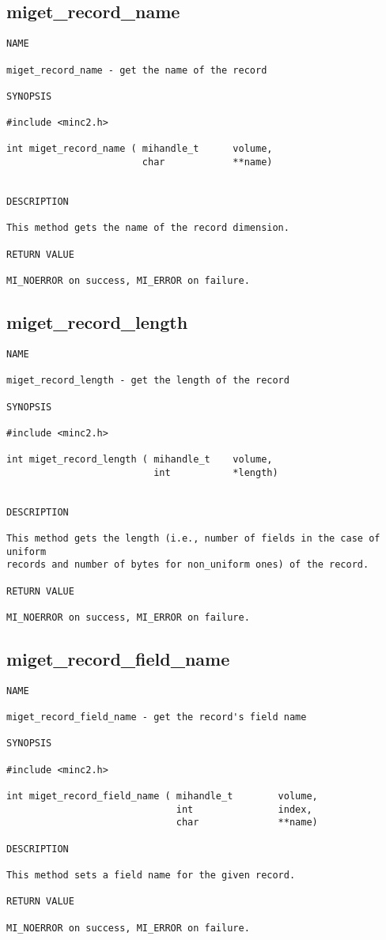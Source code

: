 \documentclass{article}
\begin{document}
\subsection{miget\_record\_name}
\begin{verbatim}
NAME

miget_record_name - get the name of the record

SYNOPSIS

#include <minc2.h>

int miget_record_name ( mihandle_t      volume,
                        char            **name)


DESCRIPTION

This method gets the name of the record dimension.

RETURN VALUE

MI_NOERROR on success, MI_ERROR on failure.
\end{verbatim}

\subsection{miget\_record\_length}
\begin{verbatim}
NAME

miget_record_length - get the length of the record

SYNOPSIS

#include <minc2.h>

int miget_record_length ( mihandle_t    volume,
                          int           *length)


DESCRIPTION

This method gets the length (i.e., number of fields in the case of uniform
records and number of bytes for non_uniform ones) of the record.

RETURN VALUE

MI_NOERROR on success, MI_ERROR on failure.
\end{verbatim}

\subsection{miget\_record\_field\_name}
\begin{verbatim}
NAME

miget_record_field_name - get the record's field name

SYNOPSIS

#include <minc2.h>

int miget_record_field_name ( mihandle_t        volume,
                              int               index,
                              char              **name)

DESCRIPTION

This method sets a field name for the given record.

RETURN VALUE

MI_NOERROR on success, MI_ERROR on failure.
\end{verbatim}
\end{document}
